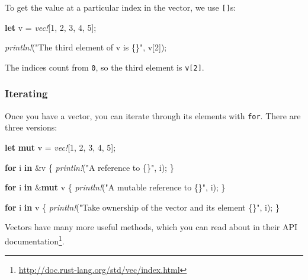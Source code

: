 \documentclass[a4paper,]{book}
\newenvironment{Shaded}{\begin{snugshade}}{\end{snugshade}}
\newcommand{\KeywordTok}[1]{\textcolor[rgb]{0.13,0.29,0.53}{\textbf{{#1}}}}
\newcommand{\DecValTok}[1]{\textcolor[rgb]{0.00,0.00,0.81}{{#1}}}
\newcommand{\StringTok}[1]{\textcolor[rgb]{0.31,0.60,0.02}{{#1}}}
\newcommand{\PreprocessorTok}[1]{\textcolor[rgb]{0.56,0.35,0.01}{\textit{{#1}}}}
\newcommand{\NormalTok}[1]{{#1}}
\renewcommand{\href}[2]{#2\footnote{\url{#1}}}
\begin{document}
To get the value at a particular index in the vector, we use
\texttt{{[}{]}}s:

\begin{Shaded}
\begin{Highlighting}[]
\KeywordTok{let} \NormalTok{v = }\PreprocessorTok{vec!}\NormalTok{[}\DecValTok{1}\NormalTok{, }\DecValTok{2}\NormalTok{, }\DecValTok{3}\NormalTok{, }\DecValTok{4}\NormalTok{, }\DecValTok{5}\NormalTok{];}

\PreprocessorTok{println!}\NormalTok{(}\StringTok{"The third element of v is \{\}"}\NormalTok{, v[}\DecValTok{2}\NormalTok{]);}
\end{Highlighting}
\end{Shaded}

The indices count from \texttt{0}, so the third element is
\texttt{v{[}2{]}}.

\subsubsection{Iterating}\label{iterating}

Once you have a vector, you can iterate through its elements with
\texttt{for}. There are three versions:

\begin{Shaded}
\begin{Highlighting}[]
\KeywordTok{let} \KeywordTok{mut} \NormalTok{v = }\PreprocessorTok{vec!}\NormalTok{[}\DecValTok{1}\NormalTok{, }\DecValTok{2}\NormalTok{, }\DecValTok{3}\NormalTok{, }\DecValTok{4}\NormalTok{, }\DecValTok{5}\NormalTok{];}

\KeywordTok{for} \NormalTok{i }\KeywordTok{in} \NormalTok{&v \{}
    \PreprocessorTok{println!}\NormalTok{(}\StringTok{"A reference to \{\}"}\NormalTok{, i);}
\NormalTok{\}}

\KeywordTok{for} \NormalTok{i }\KeywordTok{in} \NormalTok{&}\KeywordTok{mut} \NormalTok{v \{}
    \PreprocessorTok{println!}\NormalTok{(}\StringTok{"A mutable reference to \{\}"}\NormalTok{, i);}
\NormalTok{\}}

\KeywordTok{for} \NormalTok{i }\KeywordTok{in} \NormalTok{v \{}
    \PreprocessorTok{println!}\NormalTok{(}\StringTok{"Take ownership of the vector and its element \{\}"}\NormalTok{, i);}
\NormalTok{\}}
\end{Highlighting}
\end{Shaded}

Vectors have many more useful methods, which you can read about in
\href{http://doc.rust-lang.org/std/vec/index.html}{their API
documentation}.
\end{document}
